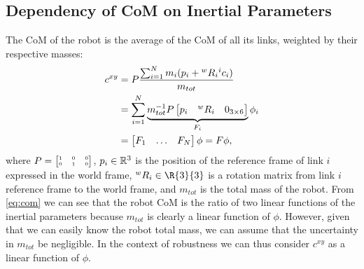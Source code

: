 \subsection{Dependency of CoM on Inertial Parameters}
The CoM of the robot is the average of the CoM of all its links, weighted by their respective masses:
\begin{equation} \label{eq:com} \begin{aligned}
c^{xy} &= P \frac{ \sum_{i=1}^{N} m_i (p_i + {}^wR_i {}^ic_i) }{m_{tot}} \\
       &= \sum_{i=1}^{N} \underbrace{m_{tot}^{-1} P \begin{bmatrix}p_i & {}^wR_i & 0_{3\times 6}\end{bmatrix}}_{F_i} \phi_i \\
       &= \begin{bmatrix}F_1 & \dots & F_N\end{bmatrix} \phi = F \phi,
\end{aligned} \end{equation}
where  $P= {\tiny\begin{bmatrix}1&0&0\\0&1&0\end{bmatrix}}$, $p_i \in \mathbb{R}^{3}$ is the position of the reference frame of link $i$ expressed in the world frame, ${}^wR_i \in \R{3}{3}$ is a rotation matrix from link $i$ reference frame to the world frame, and $m_{tot}$ is the total mass of the robot.
From \eqref{eq:com} we can see that the robot CoM is the ratio of two linear functions of the inertial parameters because $m_{tot}$ is clearly a linear function of $\phi$.
However, given that we can easily know the robot total mass, we can assume that the uncertainty in $m_{tot}$ be negligible.
In the context of robustness we can thus consider $c^{xy}$ as a linear function of $\phi$.

